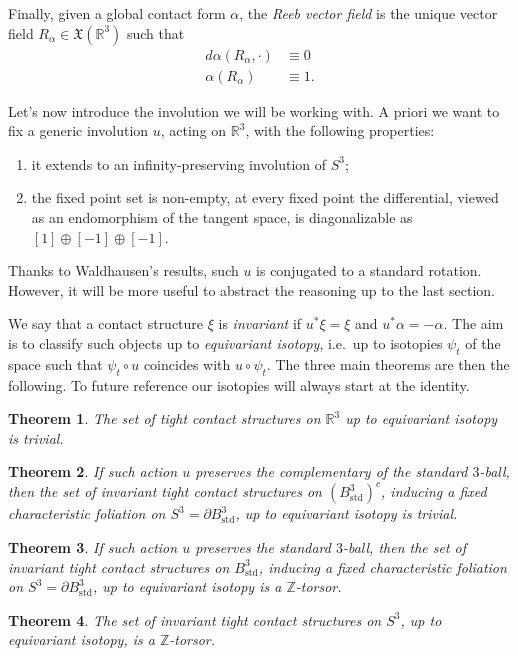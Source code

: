 \documentclass[a4paper, 11pt]{amsart}
\theoremstyle{plain}
\newtheorem{thm}{Theorem}
\theoremstyle{definition}
\newcommand{\R}{\mathbb{R}}
\newcommand{\sd}{\text{std}}
\newcommand{\Z}{\mathbb{Z}}
\begin{document}
Finally, given a global contact form $\alpha$, the \emph{Reeb vector field} is the unique vector field $R_\alpha \in \mathfrak{X}(\R^3)$ such that 
\[
\begin{split}
	d\alpha(R_\alpha,\cdot) &\equiv 0 \\
	\alpha(R_\alpha) &\equiv 1.
\end{split}
\]

Let's now introduce the involution we will be working with. A priori we want to fix a generic involution $u$, acting on $\R^3$, with the following properties:
\begin{enumerate}
	\item it extends to an infinity-preserving involution of $S^3$;
	\item the fixed point set is non-empty, at every fixed point the differential, viewed as an endomorphism of the tangent space, is diagonalizable as $[1] \oplus [-1] \oplus [-1]$.
\end{enumerate}
Thanks to Waldhausen's results, such $u$ is conjugated to a standard rotation. However, it will be more useful to abstract the reasoning up to the last section.

We say that a contact structure $\xi$ is \emph{invariant} if $u^*\xi = \xi$ and $u^*\alpha = -\alpha$. The aim is to classify such objects up to \emph{equivariant isotopy}, i.e.\ up to isotopies $\psi_t$ of the space such that $\psi_t \circ u$ coincides with $u \circ \psi_t$. The three main theorems are then the following. To future reference our isotopies will always start at the identity.

\begin{thm}\label{thmmainthmRthree}
	The set of tight contact structures on $\R^3$ up to equivariant isotopy is trivial.
\end{thm}
\begin{thm}\label{thmmainthmDthreecomplementary}
	If such action $u$ preserves the complementary of the standard $3$-ball, then the set of invariant tight contact structures on $(B^3_{\sd})^c$, inducing a fixed characteristic foliation on $S^3 = \partial B^3_{\sd}$, up to equivariant isotopy is trivial.
\end{thm}
\begin{thm}\label{thmmainthmDthree}
	If such action $u$ preserves the standard $3$-ball, then the set of invariant tight contact structures on $B^3_{\sd}$, inducing a fixed characteristic foliation on $S^3 = \partial B^3_{\sd}$, up to equivariant isotopy is a $\Z$-torsor.
\end{thm}
\begin{thm}\label{thmmainthmSthree}
	The set of invariant tight contact structures on $S^3$, up to equivariant isotopy, is a $\Z$-torsor.
\end{thm}
\end{document}
